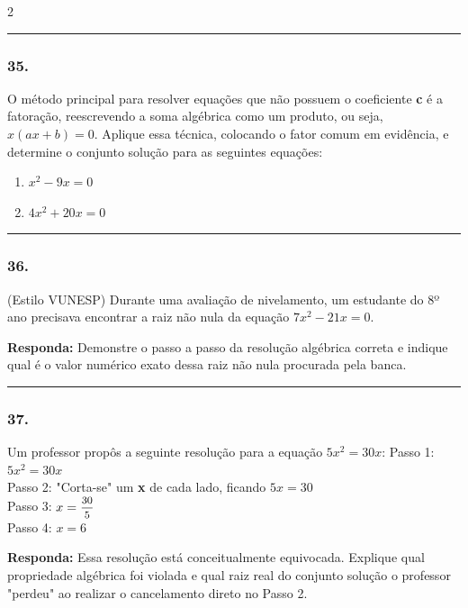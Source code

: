 \documentclass[twoside, 10pt, a4paper]{article}
\newlength{\espacoPreQuestao}\setlength{\espacoPreQuestao}{0.1cm}
\newlength{\espacoQuestao}\setlength{\espacoQuestao}{0.2cm}
\begin{document}
\begin{multicols*}{2}
\noindent\textcolor{CorLinha}{\rule{\linewidth}{0.5pt}} 
\par\vspace{\espacoPreQuestao}
\subsubsection*{35.} O método principal para resolver equações que não possuem o coeficiente \textbf{c} é a fatoração, reescrevendo a soma algébrica como um produto, ou seja, $ x(ax + b) = 0 $. Aplique essa técnica, colocando o fator comum em evidência, e determine o conjunto solução para as seguintes equações:
\begin{enumerate}[label=\Alph*)]
    \item $ x^2 - 9x = 0 $
    \item $ 4x^2 + 20x = 0 $
\end{enumerate}
\par\vspace{\espacoQuestao}

\noindent\textcolor{CorLinha}{\rule{\linewidth}{0.5pt}} 
\par\vspace{\espacoPreQuestao}
\subsubsection*{36.} (Estilo VUNESP) Durante uma avaliação de nivelamento, um estudante do 8º ano precisava encontrar a raiz não nula da equação $ 7x^2 - 21x = 0 $. 
\begin{boxresponda}
\textbf{Responda:} Demonstre o passo a passo da resolução algébrica correta e indique qual é o valor numérico exato dessa raiz não nula procurada pela banca.
\end{boxresponda}
\par\vspace{\espacoQuestao}

\noindent\textcolor{CorLinha}{\rule{\linewidth}{0.5pt}} 
\par\vspace{\espacoPreQuestao}
\subsubsection*{37.} Um professor propôs a seguinte resolução para a equação $ 5x^2 = 30x $:
Passo 1: $ 5x^2 = 30x $ \\
Passo 2: "Corta-se" um \textbf{x} de cada lado, ficando $ 5x = 30 $ \\
Passo 3: $ x = \mfrac{30}{5} $ \\
Passo 4: $ x = 6 $
\begin{boxresponda}
\textbf{Responda:} Essa resolução está conceitualmente equivocada. Explique qual propriedade algébrica foi violada e qual raiz real do conjunto solução o professor "perdeu" ao realizar o cancelamento direto no Passo 2.
\end{boxresponda}
\par\vspace{\espacoQuestao}


\end{multicols*}
\end{document}
